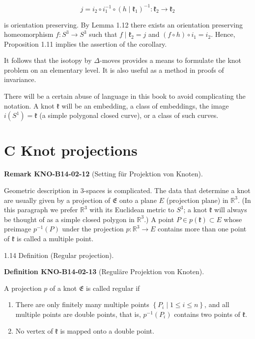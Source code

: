 \documentclass[10pt, letterpaper]{article}
\newcommand{\CustomHeading}[3]{%
  \par\medskip\noindent%
  \textbf{#1 #2} \textnormal{(#3)}.\enskip%
}
\newenvironment{DEF}[2]{\begin{unitbox}\CustomHeading{Definition}{#1}{#2}}{\end{unitbox}}
\newenvironment{REM}[2]{\begin{unitbox}\CustomHeading{Remark}{#1}{#2}}{\end{unitbox}}
\begin{document}
$$
j=i_{2} \circ i_{1}^{-1} \circ\left(h \mid \mathfrak{k}_{1}\right)^{-1}: \mathfrak{k}_{2} \rightarrow \mathfrak{k}_{2}
$$

is orientation preserving. By Lemma 1.12 there exists an orientation preserving homeomorphism $f: S^{3} \rightarrow S^{3}$ such that $f \mid \mathfrak{k}_{2}=j$ and $(f \circ h) \circ i_{1}=i_{2}$. Hence, Proposition 1.11 implies the assertion of the corollary.

It follows that the isotopy by $\Delta$-moves provides a means to formulate the knot problem on an elementary level. It is also useful as a method in proofs of invariance.

There will be a certain abuse of language in this book to avoid complicating the notation. A knot $\mathfrak{k}$ will be an embedding, a class of embeddings, the image $i\left(S^{1}\right)=\mathfrak{k}$ (a simple polygonal closed curve), or a class of such curves.

\section*{C Knot projections}

\begin{REM}{KNO-B14-02-12}{Setting für Projektion von Knoten}
Geometric description in 3-spaces is complicated. The data that determine a knot are usually given by a projection of $\mathfrak{E}$ onto a plane $E$ (projection plane) in $\mathbb{R}^{3}$. (In this paragraph we prefer $\mathbb{R}^{3}$ with its Euclidean metric to $S^{3}$; a knot $\mathfrak{k}$ will always be thought of as a simple closed polygon in $\mathbb{R}^{3}$.) A point $P \in p(\mathfrak{k}) \subset E$ whose preimage $p^{-1}(P)$ under the projection $p: \mathbb{R}^{3} \rightarrow E$ contains more than one point of $\mathfrak{k}$ is called a multiple point.
\end{REM}


1.14 Definition (Regular projection). 

\begin{DEF}{KNO-B14-02-13}{Reguläre Projektion von Knoten}
A projection $p$ of a knot $\mathfrak{E}$ is called regular if\\
\begin{enumerate}
  \item There are only finitely many multiple points \( \left\{P_{i} \mid 1 \leq i \leq n\right\} \), and all multiple points are double points, that is, \( p^{-1}\left(P_{i}\right) \) contains two points of \( \mathfrak{k} \).
  \item No vertex of \( \mathfrak{k} \) is mapped onto a double point.
\end{enumerate}
\end{DEF}
\end{document}
